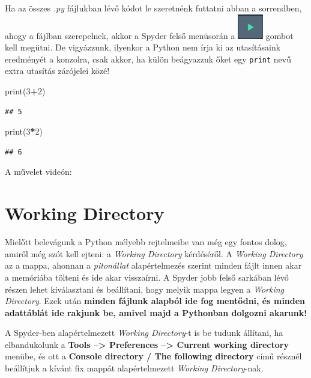 \documentclass[
]{book}
\newenvironment{Shaded}{\begin{snugshade}}{\end{snugshade}}
\newcommand{\BuiltInTok}[1]{#1}
\newcommand{\DecValTok}[1]{\textcolor[rgb]{0.00,0.00,0.81}{#1}}
\newcommand{\NormalTok}[1]{#1}
\newcommand{\OperatorTok}[1]{\textcolor[rgb]{0.81,0.36,0.00}{\textbf{#1}}}
\begin{document}
Ha az összes \emph{.py} fájlukban lévő kódot le szeretnénk futtatni abban a sorrendben, ahogy a fájlban szerepelnek, akkor a Spyder felső menüsorán a \includegraphics{RunFile.jpg} gombot kell megütni. De vigyázzunk, ilyenkor a Python nem írja ki az utasításaink eredményét a konzolra, csak akkor, ha külön beágyazzuk őket egy \texttt{print} nevű extra utasítás zárójelei közé!

\begin{Shaded}
\begin{Highlighting}[]
\BuiltInTok{print}\NormalTok{(}\DecValTok{3}\OperatorTok{+}\DecValTok{2}\NormalTok{)}
\end{Highlighting}
\end{Shaded}

\begin{verbatim}
## 5
\end{verbatim}

\begin{Shaded}
\begin{Highlighting}[]
\BuiltInTok{print}\NormalTok{(}\DecValTok{3}\OperatorTok{*}\DecValTok{2}\NormalTok{)}
\end{Highlighting}
\end{Shaded}

\begin{verbatim}
## 6
\end{verbatim}

A művelet videón:

\section{Working Directory}\label{working-directory}

Mielőtt belevágunk a Python mélyebb rejtelmeibe van még egy fontos dolog, amiről még szót kell ejteni: a \emph{Working Directory} kérdéséről.
A \emph{Working Directory} az a mappa, ahonnan a \emph{pitonállat} alapértelmezés szerint minden fájlt innen akar a memóriába tölteni és ide akar visszaírni.
A Spyder jobb felső sarkában lévő részen lehet kiválasztani és beállítani, hogy melyik mappa legyen a \emph{Working Directory}. Ezek után \textbf{minden fájlunk alapból ide fog mentődni, és minden adattáblát ide rakjunk be, amivel majd a Pythonban dolgozni akarunk!}

A Spyder-ben alapértelmezett \emph{Working Directory}-t is be tudunk állítani, ha elbandukolunk a \textbf{Tools --\textgreater{} Preferences --\textgreater{} Current working directory} menübe, és ott a \textbf{Console directory / The following directory} című résznél beállítjuk a kívánt fix mappát alapértelmezett \emph{Working Directory}-nak.
\end{document}
